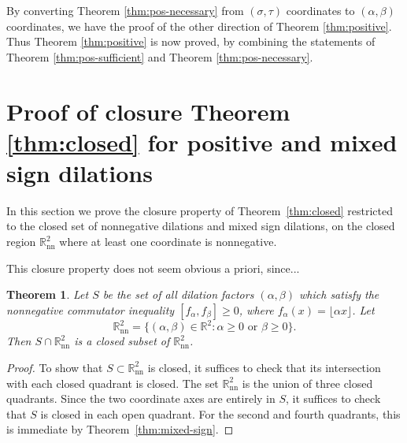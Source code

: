 \documentclass[11pt, letterpaper, reqno]{amsart}
\newtheorem{thm}{Theorem}[section]
\theoremstyle{definition}
\numberwithin{equation}{section}
\newcommand{\RR}{\ensuremath{\mathbb{R}}}
\newcommand{\floor}[1]{\lfloor{#1}\rfloor}
\newcommand{\talpha}{{\sigma}}
\newcommand{\trho}{{\tau}}
\begin{document}
{By converting Theorem \ref{thm:pos-necessary} from $(\talpha,\trho)$ coordinates
to $(\alpha,\beta)$ coordinates, we have the proof of the other direction of Theorem \ref{thm:positive}.
Thus Theorem \ref{thm:positive} is now proved,
by combining the statements of Theorem \ref{thm:pos-sufficient} and Theorem \ref{thm:pos-necessary}.

%
%
\section{Proof of closure Theorem \ref{thm:closed} for positive and mixed sign dilations}
\label{sec:consequences}
\setcounter{equation}{0}


In this section we prove the closure property of Theorem~\ref{thm:closed} 
restricted to the closed set  of nonnegative dilations and mixed sign dilations, on 
the closed region $\RR^2_\mathrm{nn}$ where at least one coordinate is nonnegative.

This closure property does not seem obvious a priori, since...
\begin{thm}
\label{thm:closed2}
Let $S$ be the set of all dilation factors $(\alpha, \beta)$ 
which satisfy the nonnegative commutator inequality ${[f_\alpha, f_\beta]\geq 0 }$,
where $f_\alpha(x) = \floor{\alpha x}$. Let 
$$\RR^2_\mathrm{nn}= \{ (\alpha, \beta) \in \RR^2 : \alpha \ge 0 \mbox{ or } \beta \ge 0\}.$$
Then $S \cap \RR^2_\mathrm{nn}$ is a closed subset of $\RR^2_\mathrm{nn}$. 
\end{thm}

\begin{proof}
To show that $S \subset \RR^2_{\mathrm {nn}}$ is closed, 
it suffices to check that its intersection with each closed quadrant is closed. 
The set $\RR^2_\mathrm{nn}$ is the union of three  closed quadrants. 
Since the two coordinate axes are entirely  in $S$,  
it suffices to check that $S$ is closed in each open quadrant.
For the second and fourth quadrants, this is immediate by Theorem~\ref{thm:mixed-sign}.


\end{proof}}
\end{document}
